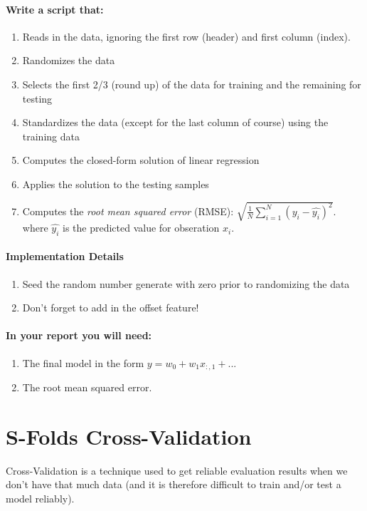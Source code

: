 \documentclass[12pt]{article}
\begin{document}
\noindent
\paragraph{Write a script that:}
\begin{enumerate}
  \item Reads in the data, ignoring the first row (header) and first column (index).
  \item Randomizes the data
  \item Selects the first 2/3 (round up) of the data for training and the remaining for testing
  \item Standardizes the data (except for the last column of course) using the training data
  \item Computes the closed-form solution of linear regression
  \item Applies the solution to the testing samples
  \item Computes the \emph{root mean squared error} (RMSE): $\sqrt{\frac{1}{N}\sum_{i=1}^N (y_i-\hat{y_i})^2}$. where $\hat{y_i}$ is the predicted value for obseration $x_i$.
\end{enumerate}


\paragraph{Implementation Details}
\begin{enumerate}
\item Seed the random number generate with zero prior to randomizing the data
\item Don't forget to add in the offset feature!
\end{enumerate}


\paragraph{In your report you will need:}
\begin{enumerate}
\item The final model in the form $y=w_0+w_1x_{:,1} + ...$
\item The root mean squared error.
\end{enumerate}



\newpage
\section{S-Folds Cross-Validation}\label{linreg}
Cross-Validation is a technique used to get reliable evaluation results when we don't have that much data (and it is therefore difficult to train and/or test a model reliably).\\
\end{document}
